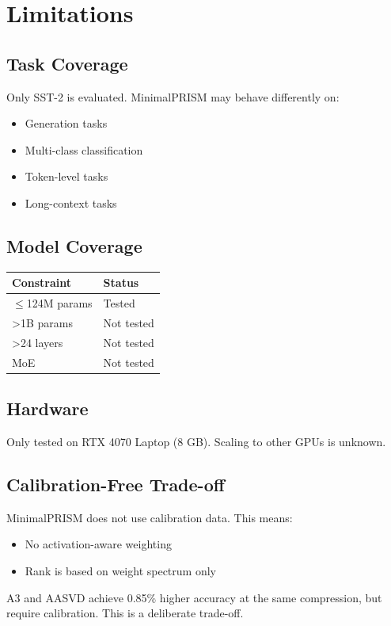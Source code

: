 
\section{Limitations}

\subsection{Task Coverage}

Only SST-2 is evaluated. MinimalPRISM may behave differently on:
\begin{itemize}
\item Generation tasks
\item Multi-class classification
\item Token-level tasks
\item Long-context tasks

\end{itemize}
\subsection{Model Coverage}

\begin{table}[H]
\centering
\small
\begin{tabular}{ll}
\toprule
\textbf{Constraint} & \textbf{Status} \\
\midrule
$\le$124M params & Tested \\
\textgreater{}1B params & Not tested \\
\textgreater{}24 layers & Not tested \\
MoE & Not tested \\
\bottomrule
\end{tabular}
\end{table}

\subsection{Hardware}

Only tested on RTX 4070 Laptop (8 GB). Scaling to other GPUs is unknown.

\subsection{Calibration-Free Trade-off}

MinimalPRISM does not use calibration data. This means:
\begin{itemize}
\item No activation-aware weighting
\item Rank is based on weight spectrum only

\end{itemize}
A3 and AASVD achieve 0.85\% higher accuracy at the same compression, 
but require calibration. This is a deliberate trade-off.

